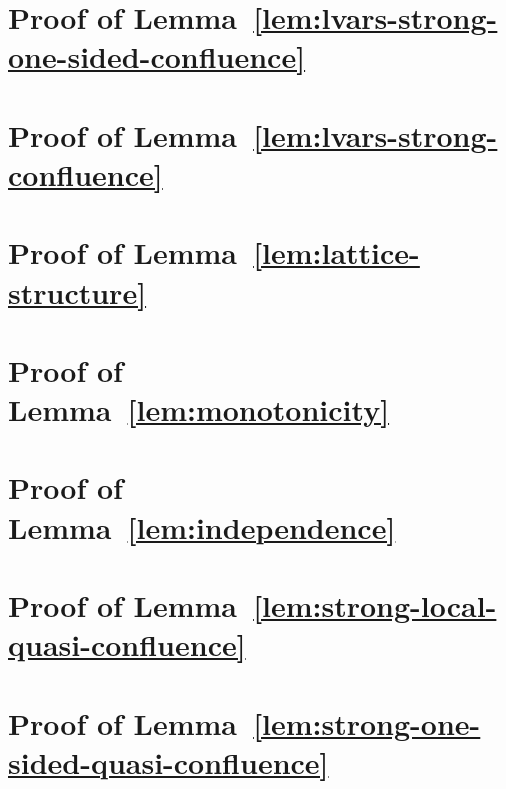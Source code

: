 \section{Proof of Lemma~\ref{lem:lvars-strong-one-sided-confluence}}\label{section:lvars-strong-one-sided-confluence-proof}


\section{Proof of Lemma~\ref{lem:lvars-strong-confluence}}\label{section:lvars-strong-confluence-proof}


\section{Proof of Lemma~\ref{lem:lattice-structure}}\label{section:lattice-structure-proof}



\section{Proof of Lemma~\ref{lem:monotonicity}}\label{section:monotonicity-proof}


\section{Proof of Lemma~\ref{lem:independence}}\label{section:independence-proof}


\section{Proof of Lemma~\ref{lem:strong-local-quasi-confluence}}\label{section:strong-local-quasi-confluence-proof}


\section{Proof of Lemma~\ref{lem:strong-one-sided-quasi-confluence}}\label{section:strong-one-sided-quasi-confluence-proof}


